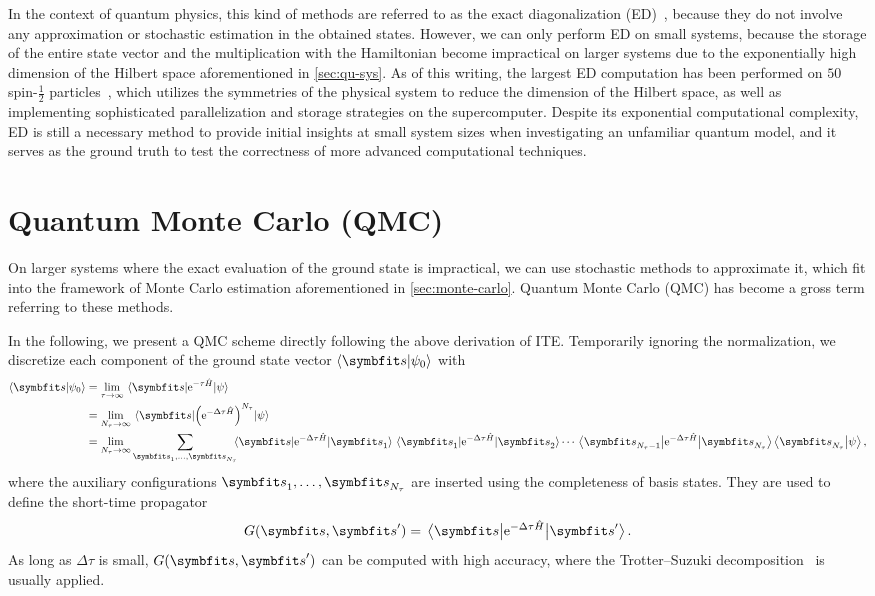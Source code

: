 In the context of quantum physics, this kind of methods are referred to as the exact diagonalization (ED)~\cite{weisse2008exact}, because they do not involve any approximation or stochastic estimation in the obtained states. However, we can only perform ED on small systems, because the storage of the entire state vector and the multiplication with the Hamiltonian become impractical on larger systems due to the exponentially high dimension of the Hilbert space aforementioned in \cref{sec:qu-sys}. As of this writing, the largest ED computation has been performed on $50$ spin-$\frac{1}{2}$ particles~\cite{wietek2018sublattice}, which utilizes the symmetries of the physical system to reduce the dimension of the Hilbert space, as well as implementing sophisticated parallelization and storage strategies on the supercomputer. Despite its exponential computational complexity, ED is still a necessary method to provide initial insights at small system sizes when investigating an unfamiliar quantum model, and it serves as the ground truth to test the correctness of more advanced computational techniques.

\section{Quantum Monte Carlo (QMC)}
\label{sec:qmc}

On larger systems where the exact evaluation of the ground state is impractical, we can use stochastic methods to approximate it, which fit into the framework of Monte Carlo estimation aforementioned in \cref{sec:monte-carlo}. Quantum Monte Carlo (QMC) has become a gross term referring to these methods.

In the following, we present a QMC scheme directly following the above derivation of ITE. Temporarily ignoring the normalization, we discretize each component of the ground state vector $\ip{\vs}{\psi_0}$ with
\begin{align}
\ip{\vs}{\psi_0} &= \lim_{\tau \to \infty} \mel{\vs}{\rme^{-\tau \hat{H}}}{\psiinit} \\
&= \lim_{N_\tau \to \infty} \mel{\vs}{\edthp^{N_\tau}}{\psiinit} \\
&= \lim_{N_\tau \to \infty} \sum_{\vs_1, \ldots, \vs_{N_\tau}}\!\!\!\!\mel{\vs}{\edth}{\vs_1} \mel{\vs_1}{\edth}{\vs_2} \cdots \mel{\vs_{N_\tau - 1}}{\edth}{\vs_{N_\tau}} \ip{\vs_{N_\tau}}{\psiinit},
\end{align}
where the auxiliary configurations $\vs_1, \ldots, \vs_{N_\tau}$ are inserted using the completeness of basis states. They are used to define the short-time propagator
\begin{equation}
G(\vs, \vs') = \mel{\vs}{\edth}{\vs'}.
\end{equation}
As long as $\Delta \tau$ is small, $G(\vs, \vs')$ can be computed with high accuracy, where the Trotter--Suzuki decomposition~\cite{suzuki1976generalized} is usually applied.

